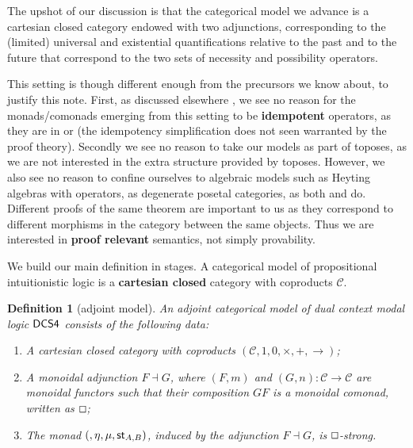 \documentclass{article}
\let\Diamond\relax
\let\mto\to
\let\to\relax
\newcommand{\to}{\rightarrow}
\renewcommand{\Box}{\oblong}
\newcommand{\cat}[1]{\mathcal{#1}}
\newcommand{\pd}[0]{\times}
\newcommand{\ihom}[0]{\rightarrow}
\newcommand{\st}[2]{\mathsf{st}_{#1,#2}}
\newtheorem{definition}[theorem]{Definition}
\begin{document}
The upshot of our discussion is that the categorical model we advance
is a cartesian closed category endowed with two adjunctions,
corresponding to the (limited) universal and existential
quantifications relative to the past and to the future that correspond
to the two sets of necessity and possibility operators.

This setting is though different enough from the precursors we know
about, to justify this note. First, as discussed elsewhere
\cite{bierman2000}, we see no reason for the monads/comonads emerging
from this setting to be \textbf{idempotent} operators, as they are in
\cite{ghilardi1988} or \cite{makkai1995} (the idempotency
simplification does not seen warranted by the proof theory). Secondly
we see no reason to take our models as part of toposes, as we are not
interested in the extra structure provided by toposes.  However, we
also see no reason to confine ourselves to algebraic models such as
Heyting algebras with operators, as degenerate posetal categories, as
both \cite{dziketal2012} and \cite{Menni:2014} do. Different proofs of
the same theorem are important to us as they correspond to different
morphisms in the category between the same objects. Thus we are
interested in \textbf{proof relevant} semantics, not simply
provability.

We build our main definition in stages. A categorical model of
propositional intuitionistic logic is a \textbf{cartesian closed}
category with coproducts $\cat{C}$.


\begin{definition}[adjoint model]
  \label{def:CS4-single-adjoint-cat-model}
  An adjoint categorical model of dual context modal logic $\sf{DCS4}$ consists of the following data:
  \begin{enumerate}
  \item A cartesian closed category with coproducts $(\cat{C},1,0,\pd,+,\ihom)$;
  \item 
    A monoidal adjunction  $F \dashv G$, where $(F,m)$ and  $(G,n)\colon \cat{C} \mto \cat{C}$ are monoidal functors such that their composition $GF$ is a monoidal comonad, written as $\Box$;
 \item The  monad $(\Diamond, \eta, \mu, \st{A}{B})$, induced by the adjunction $F \dashv G$,   is $\Box$-strong.
  \end{enumerate}
\end{definition}
\end{document}
